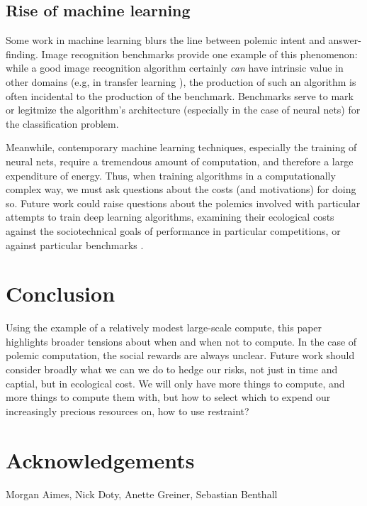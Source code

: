 \documentclass[sigconf]{acmart}
\begin{document}
\subsection{Rise of machine learning}
\label{sec:orgb032e46}

Some work in machine learning blurs the line 
between polemic intent and answer-finding.
Image recognition benchmarks provide one example of this phenomenon:
while a good image recognition algorithm certainly \emph{can} have intrinsic value in other domains 
(e.g, in transfer learning \cite{Jean2016f}),
the production of such an algorithm is often incidental to the production of the benchmark.
Benchmarks serve to mark or legitmize the algorithm's architecture (especially in the case of neural nets)
for the classification problem.

Meanwhile, contemporary machine learning techniques, especially the training of neural nets, 
require a tremendous amount of computation, and therefore a large expenditure of energy.
Thus, when training algorithms in a computationally complex way,
we must ask questions about the costs (and motivations) for doing so.
Future work could raise questions about the polemics involved
with particular attempts to train deep learning algorithms,
examining their ecological costs against the sociotechnical goals 
of performance in particular competitions, or against particular benchmarks \cite{SixSilberman2015}.


\section{Conclusion}
\label{sec:orgeed12ab}

Using the example of a relatively modest large-scale compute,
this paper highlights broader tensions about when and when not to compute.
In the case of polemic computation, the social rewards are always unclear.
Future work should consider broadly what we can we do to hedge our risks, 
not just in time and captial,
but in ecological cost.
We will only have more things to compute,
and more things to compute them with,
but how to select which to expend our increasingly precious resources on, 
how to use restraint?


\section{Acknowledgements}
\label{sec:org85cf661}
Morgan Aimes, Nick Doty, Anette Greiner, Sebastian Benthall



\end{document}
